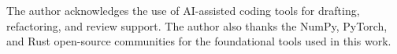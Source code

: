 
The author acknowledges the use of AI-assisted coding tools for drafting, refactoring, and review support. The author also thanks the NumPy, PyTorch, and Rust open-source communities for the foundational tools used in this work.
